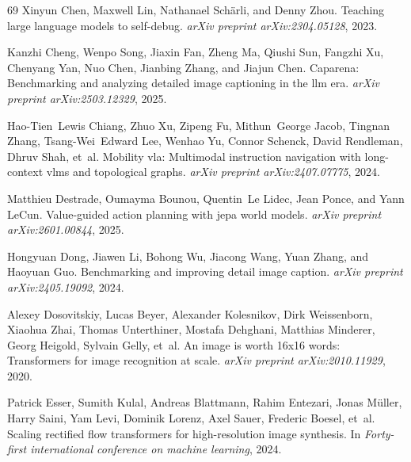 \begin{thebibliography}{69}
Xinyun Chen, Maxwell Lin, Nathanael Sch{\"a}rli, and Denny Zhou.
\newblock Teaching large language models to self-debug.
\newblock \emph{arXiv preprint arXiv:2304.05128}, 2023.

Kanzhi Cheng, Wenpo Song, Jiaxin Fan, Zheng Ma, Qiushi Sun, Fangzhi Xu, Chenyang Yan, Nuo Chen, Jianbing Zhang, and Jiajun Chen.
\newblock Caparena: Benchmarking and analyzing detailed image captioning in the llm era.
\newblock \emph{arXiv preprint arXiv:2503.12329}, 2025.

Hao-Tien~Lewis Chiang, Zhuo Xu, Zipeng Fu, Mithun~George Jacob, Tingnan Zhang, Tsang-Wei~Edward Lee, Wenhao Yu, Connor Schenck, David Rendleman, Dhruv Shah, et~al.
\newblock Mobility vla: Multimodal instruction navigation with long-context vlms and topological graphs.
\newblock \emph{arXiv preprint arXiv:2407.07775}, 2024.

Matthieu Destrade, Oumayma Bounou, Quentin~Le Lidec, Jean Ponce, and Yann LeCun.
\newblock Value-guided action planning with jepa world models.
\newblock \emph{arXiv preprint arXiv:2601.00844}, 2025.

Hongyuan Dong, Jiawen Li, Bohong Wu, Jiacong Wang, Yuan Zhang, and Haoyuan Guo.
\newblock Benchmarking and improving detail image caption.
\newblock \emph{arXiv preprint arXiv:2405.19092}, 2024.

Alexey Dosovitskiy, Lucas Beyer, Alexander Kolesnikov, Dirk Weissenborn, Xiaohua Zhai, Thomas Unterthiner, Mostafa Dehghani, Matthias Minderer, Georg Heigold, Sylvain Gelly, et~al.
\newblock An image is worth 16x16 words: Transformers for image recognition at scale.
\newblock \emph{arXiv preprint arXiv:2010.11929}, 2020.

Patrick Esser, Sumith Kulal, Andreas Blattmann, Rahim Entezari, Jonas M{\"u}ller, Harry Saini, Yam Levi, Dominik Lorenz, Axel Sauer, Frederic Boesel, et~al.
\newblock Scaling rectified flow transformers for high-resolution image synthesis.
\newblock In \emph{Forty-first international conference on machine learning}, 2024.


\end{thebibliography}

